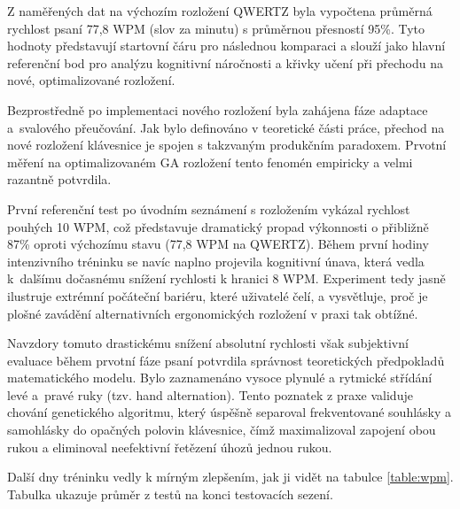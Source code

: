\documentclass[a4paper, twoside, 12pt, czech]{article}
\begin{document}
Z naměřených dat na výchozím rozložení QWERTZ byla vypočtena průměrná rychlost 
psaní 77,8 WPM (slov za minutu) s průměrnou přesností 95\space\%. Tyto hodnoty 
představují startovní čáru pro následnou komparaci a slouží jako hlavní 
referenční bod pro analýzu kognitivní náročnosti a křivky učení při přechodu na 
nové, optimalizované rozložení.

Bezprostředně po implementaci nového rozložení byla zahájena fáze adaptace a~svalového 
přeučování. Jak bylo definováno v teoretické části práce, přechod na nové rozložení 
klávesnice je spojen s takzvaným produkčním paradoxem. Prvotní měření na optimalizovaném
GA rozložení tento fenomén empiricky a velmi razantně potvrdila.

První referenční test po úvodním seznámení s rozložením vykázal rychlost pouhých 
10 WPM, což představuje dramatický propad výkonnosti o přibližně 87\space\% oproti 
výchozímu stavu (77,8 WPM na QWERTZ). Během první hodiny intenzivního tréninku se 
navíc naplno projevila kognitivní únava, která vedla k~další\-mu dočasnému snížení 
rychlosti k hranici 8 WPM. Experiment tedy jasně ilustruje extrémní počáteční bariéru, 
které uživatelé čelí, a vysvětluje, proč je plošné zavádění alternativních 
ergonomických rozložení v praxi tak obtížné.

Navzdory tomuto drastickému snížení absolutní rychlosti však subjektivní evaluace 
během prvotní fáze psaní potvrdila správnost teoretických předpokladů matematického 
modelu. Bylo zaznamenáno vysoce plynulé a rytmické střídání levé a~pravé ruky 
(tzv. hand alternation). Tento poznatek z praxe validuje chování genetického 
algoritmu, který úspěšně separoval frekventované souhlásky a samohlásky do 
opačných polovin klávesnice, čímž maximalizoval zapojení obou rukou a eliminoval 
neefektivní řetězení úhozů jednou rukou.

Další dny tréninku vedly k mírným zlepšením, jak ji vidět na tabulce \ref{table:wpm}.
Tabulka ukazuje průměr z testů na konci testovacích sezení.
\end{document}
